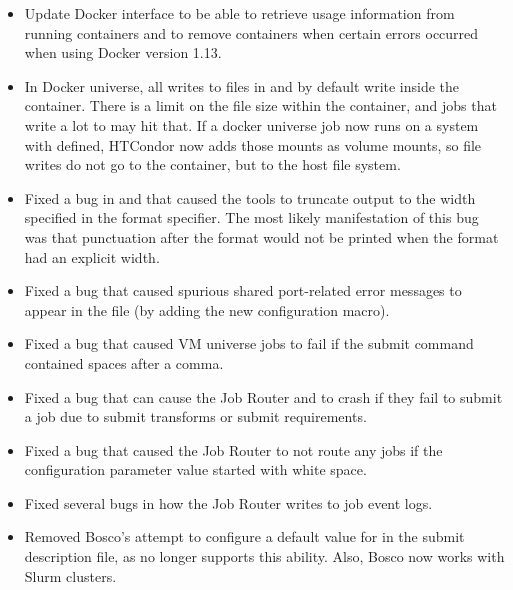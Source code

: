 \begin{itemize}

\item Update Docker interface to be able to retrieve usage information
from running containers and to remove containers when certain errors
occurred when using Docker version 1.13.

\item In Docker universe, all writes to files in  and  by default
write inside the container.  There is a limit on the file size within the container,
and jobs that write a lot to  may hit that.  If a docker universe job now runs
on a system with  defined, HTCondor now adds those
mounts as volume mounts, so file writes do not go to the container, but to the host
file system.

\item Fixed a bug in   and   that caused the
tools to truncate output to the width specified in the format specifier. The most likely manifestation of
this bug was that punctuation after the format would not be printed when the format had an explicit width.

\item Fixed a bug that caused spurious shared port-related error
messages to appear in the  file (by adding the
new  configuration macro).

\item Fixed a bug that caused VM universe jobs to fail if the
 submit command contained spaces after a comma.

\item Fixed a bug that can cause the Job Router and  to
crash if they fail to submit a job due to submit transforms or
submit requirements.

\item Fixed a bug that caused the Job Router to not route any jobs if
the  configuration parameter value
started with white space.

\item Fixed several bugs in how the Job Router writes to job event logs.

\item Removed Bosco's attempt to configure a default value for
 in the submit description file, as
 no longer supports this ability.
Also, Bosco now works with Slurm clusters.


\end{itemize}
